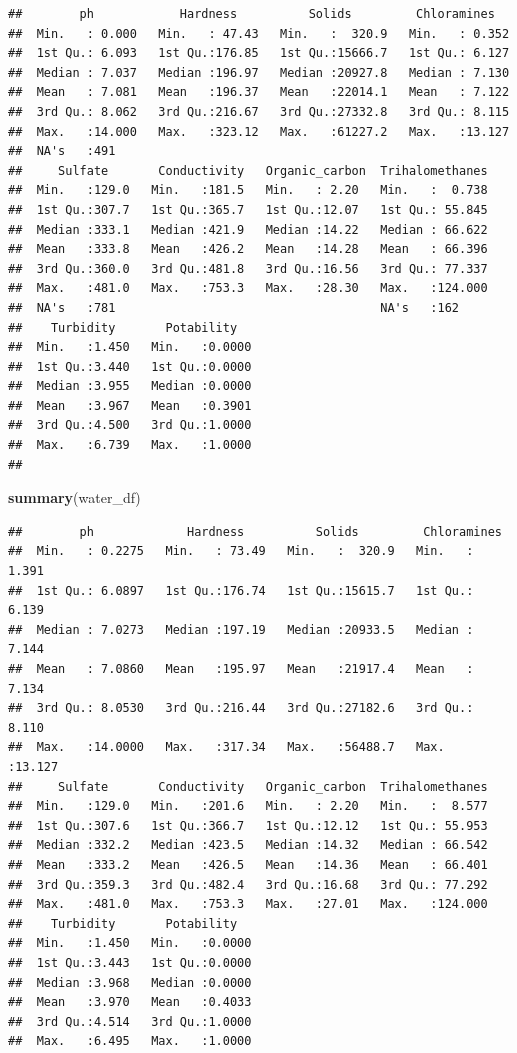 \documentclass[
]{book}
\newenvironment{Shaded}{\begin{snugshade}}{\end{snugshade}}
\newcommand{\FunctionTok}[1]{\textcolor[rgb]{0.13,0.29,0.53}{\textbf{#1}}}
\newcommand{\NormalTok}[1]{#1}
\begin{document}
\begin{verbatim}
##        ph            Hardness          Solids         Chloramines    
##  Min.   : 0.000   Min.   : 47.43   Min.   :  320.9   Min.   : 0.352  
##  1st Qu.: 6.093   1st Qu.:176.85   1st Qu.:15666.7   1st Qu.: 6.127  
##  Median : 7.037   Median :196.97   Median :20927.8   Median : 7.130  
##  Mean   : 7.081   Mean   :196.37   Mean   :22014.1   Mean   : 7.122  
##  3rd Qu.: 8.062   3rd Qu.:216.67   3rd Qu.:27332.8   3rd Qu.: 8.115  
##  Max.   :14.000   Max.   :323.12   Max.   :61227.2   Max.   :13.127  
##  NA's   :491                                                         
##     Sulfate       Conductivity   Organic_carbon  Trihalomethanes  
##  Min.   :129.0   Min.   :181.5   Min.   : 2.20   Min.   :  0.738  
##  1st Qu.:307.7   1st Qu.:365.7   1st Qu.:12.07   1st Qu.: 55.845  
##  Median :333.1   Median :421.9   Median :14.22   Median : 66.622  
##  Mean   :333.8   Mean   :426.2   Mean   :14.28   Mean   : 66.396  
##  3rd Qu.:360.0   3rd Qu.:481.8   3rd Qu.:16.56   3rd Qu.: 77.337  
##  Max.   :481.0   Max.   :753.3   Max.   :28.30   Max.   :124.000  
##  NA's   :781                                     NA's   :162      
##    Turbidity       Potability    
##  Min.   :1.450   Min.   :0.0000  
##  1st Qu.:3.440   1st Qu.:0.0000  
##  Median :3.955   Median :0.0000  
##  Mean   :3.967   Mean   :0.3901  
##  3rd Qu.:4.500   3rd Qu.:1.0000  
##  Max.   :6.739   Max.   :1.0000  
## 
\end{verbatim}

\begin{Shaded}
\begin{Highlighting}[]
\FunctionTok{summary}\NormalTok{(water\_df)}
\end{Highlighting}
\end{Shaded}

\begin{verbatim}
##        ph             Hardness          Solids         Chloramines    
##  Min.   : 0.2275   Min.   : 73.49   Min.   :  320.9   Min.   : 1.391  
##  1st Qu.: 6.0897   1st Qu.:176.74   1st Qu.:15615.7   1st Qu.: 6.139  
##  Median : 7.0273   Median :197.19   Median :20933.5   Median : 7.144  
##  Mean   : 7.0860   Mean   :195.97   Mean   :21917.4   Mean   : 7.134  
##  3rd Qu.: 8.0530   3rd Qu.:216.44   3rd Qu.:27182.6   3rd Qu.: 8.110  
##  Max.   :14.0000   Max.   :317.34   Max.   :56488.7   Max.   :13.127  
##     Sulfate       Conductivity   Organic_carbon  Trihalomethanes  
##  Min.   :129.0   Min.   :201.6   Min.   : 2.20   Min.   :  8.577  
##  1st Qu.:307.6   1st Qu.:366.7   1st Qu.:12.12   1st Qu.: 55.953  
##  Median :332.2   Median :423.5   Median :14.32   Median : 66.542  
##  Mean   :333.2   Mean   :426.5   Mean   :14.36   Mean   : 66.401  
##  3rd Qu.:359.3   3rd Qu.:482.4   3rd Qu.:16.68   3rd Qu.: 77.292  
##  Max.   :481.0   Max.   :753.3   Max.   :27.01   Max.   :124.000  
##    Turbidity       Potability    
##  Min.   :1.450   Min.   :0.0000  
##  1st Qu.:3.443   1st Qu.:0.0000  
##  Median :3.968   Median :0.0000  
##  Mean   :3.970   Mean   :0.4033  
##  3rd Qu.:4.514   3rd Qu.:1.0000  
##  Max.   :6.495   Max.   :1.0000
\end{verbatim}
\end{document}
